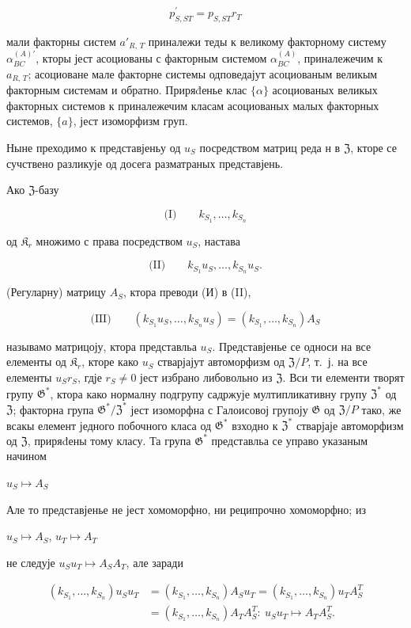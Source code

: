 \documentclass[11pt]{article}
\begin{document}
\[p_{S,ST}^{\prime}=p_{S,ST}r_{T}\]

мали факторны систем \(a'_{R,\,T}\) приналежи теды к великому факторному систему \(\alpha^{(A)\prime}_{BC}\), кторы јест асоциованы с факторным системом \(\alpha^{(A)}_{BC}\), приналежечим к \(a_{R,\,T}\); асоциоване мале факторне системы одповедајут асоциованым великым факторным системам и обратно. Приряđенье клас \(\{\alpha\}\) асоциованых великых факторных системов к приналежечим класам асоциованых малых факторных системов, \(\{a\}\), јест изоморфизм груп.

Ныне преходимо к представјеньу од \(u_S\) посредством матриц реда н в \(\mathfrak{Z}\), кторе се сучствено разликује од досега разматраных представјень.

Ако \(\mathfrak Z\)-базу

\[
\text{(I)}\qquad k_{S_1}, \ldots, k_{S_n}
\]

од \(\mathfrak K_r\) множимо с права посредством \(u_S\), настава

\[
\text{(II)}\qquad k_{S_1}u_S, \ldots, k_{S_n}u_S.
\]

(Регуларну) матрицу \(A_S\), ктора преводи (И) в (II),

\[
\text{(III)}\qquad (k_{S_1}u_S, \ldots, k_{S_n}u_S) = (k_{S_1}, \ldots, k_{S_n})A_S
\]

называмо матрицоју, ктора представльа \(u_S\). Представјенье се односи на все елементы од \(\mathfrak K_{r}\), кторе како \(u_S\) стварјајут автоморфизм од \(\mathfrak Z/P\), т.~ј. на все елементы \(u_Sr_S\), гдје \(r_S \neq 0\) јест избрано либовольно из \(\mathfrak Z\). Вси ти елементи творят групу \(\mathfrak G^*\), ктора како нормалну подгрупу садржује мултипликативну групу \(\mathfrak Z^*\) од \(\mathfrak Z\); факторна група \(\mathfrak G^*/\mathfrak Z^*\) јест изоморфна с Галоисовој групоју \(\mathfrak G\) од \(\mathfrak Z/P\) тако, же всакы елемент једного побочного класа од \(\mathfrak G^*\) взходно к \(\mathfrak Z^*\) стварјаје автоморфизм од \(\mathfrak Z\), приряđены тому класу. Та група \(\mathfrak G^*\) представльа се управо указаным начином

\(u_S \mapsto A_S\)

Але то представјенье не јест хомоморфно, ни реципрочно хомоморфно; из

\(u_S \mapsto A_S\), \(u_T \mapsto A_T\)

не следује \(u_Su_T \mapsto A_SA_T\), але заради

\[
\begin{aligned}
(k_{S_1}, \ldots, k_{S_n})u_Su_T
&=(k_{S_1}, \ldots, k_{S_n})A_Su_T
=(k_{S_1}, \ldots, k_{S_n})u_TA_S^T\\
&=(k_{S_1}, \ldots, k_{S_n})A_TA_S^T:\ u_Su_T\mapsto A_TA_S^T.
\end{aligned}
\]
\end{document}
